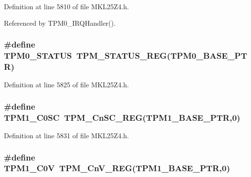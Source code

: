 Definition at line 5810 of file M\+K\+L25\+Z4.\+h.



Referenced by T\+P\+M0\+\_\+\+I\+R\+Q\+Handler().

\subsubsection[{\texorpdfstring{T\+P\+M0\+\_\+\+S\+T\+A\+T\+US}{TPM0_STATUS}}]{\setlength{\rightskip}{0pt plus 5cm}\#define T\+P\+M0\+\_\+\+S\+T\+A\+T\+US~{\bf T\+P\+M\+\_\+\+S\+T\+A\+T\+U\+S\+\_\+\+R\+EG}({\bf T\+P\+M0\+\_\+\+B\+A\+S\+E\+\_\+\+P\+TR})}\hypertarget{group___t_p_m___register___accessor___macros_ga612a6554a025e1f1917fcfa61f76f605}{}\label{group___t_p_m___register___accessor___macros_ga612a6554a025e1f1917fcfa61f76f605}


Definition at line 5825 of file M\+K\+L25\+Z4.\+h.

\subsubsection[{\texorpdfstring{T\+P\+M1\+\_\+\+C0\+SC}{TPM1_C0SC}}]{\setlength{\rightskip}{0pt plus 5cm}\#define T\+P\+M1\+\_\+\+C0\+SC~{\bf T\+P\+M\+\_\+\+Cn\+S\+C\+\_\+\+R\+EG}({\bf T\+P\+M1\+\_\+\+B\+A\+S\+E\+\_\+\+P\+TR},0)}\hypertarget{group___t_p_m___register___accessor___macros_ga58a59b05fd3f0638949b291148b312e1}{}\label{group___t_p_m___register___accessor___macros_ga58a59b05fd3f0638949b291148b312e1}


Definition at line 5831 of file M\+K\+L25\+Z4.\+h.

\subsubsection[{\texorpdfstring{T\+P\+M1\+\_\+\+C0V}{TPM1_C0V}}]{\setlength{\rightskip}{0pt plus 5cm}\#define T\+P\+M1\+\_\+\+C0V~{\bf T\+P\+M\+\_\+\+Cn\+V\+\_\+\+R\+EG}({\bf T\+P\+M1\+\_\+\+B\+A\+S\+E\+\_\+\+P\+TR},0)}\hypertarget{group___t_p_m___register___accessor___macros_gaf7d34d83f3eff6bccd684ccc4412b8db}{}\label{group___t_p_m___register___accessor___macros_gaf7d34d83f3eff6bccd684ccc4412b8db}


